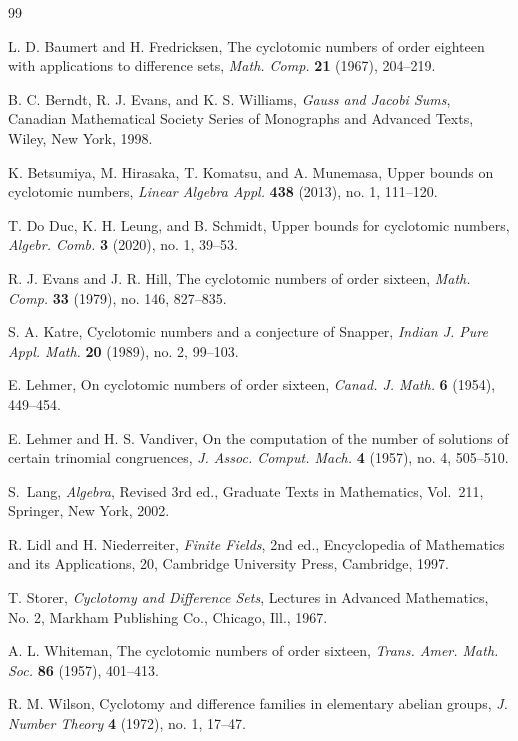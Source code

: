 \documentclass[10pt,a4paper]{article}
\numberwithin{equation}{section}
\begin{document}
\begin{thebibliography}{99}

L. D. Baumert and H. Fredricksen,
\newblock The cyclotomic numbers of order eighteen with applications to difference sets,
\newblock \emph{Math. Comp.} \textbf{21} (1967), 204--219.

B. C. Berndt, R. J. Evans, and K. S. Williams,
\newblock \emph{Gauss and Jacobi Sums},
\newblock Canadian Mathematical Society Series of Monographs and Advanced Texts,
\newblock Wiley, New York, 1998.

K. Betsumiya, M. Hirasaka, T. Komatsu, and A. Munemasa,
\newblock Upper bounds on cyclotomic numbers,
\newblock \emph{Linear Algebra Appl.} \textbf{438} (2013), no. 1, 111--120.

T. Do Duc, K. H. Leung, and B. Schmidt,
\newblock Upper bounds for cyclotomic numbers,
\newblock \emph{Algebr. Comb.} \textbf{3} (2020), no. 1, 39--53.


R. J. Evans and J. R. Hill,
\newblock The cyclotomic numbers of order sixteen,
\newblock \emph{Math. Comp.} \textbf{33} (1979), no. 146, 827--835.

S. A. Katre,
\newblock Cyclotomic numbers and a conjecture of Snapper,
\newblock \emph{Indian J. Pure Appl. Math.} \textbf{20} (1989), no. 2, 99--103.

E. Lehmer,
\newblock On cyclotomic numbers of order sixteen,
\newblock \emph{Canad. J. Math.} \textbf{6} (1954), 449--454.

E. Lehmer and H. S. Vandiver,
\newblock On the computation of the number of solutions of certain trinomial congruences,
\newblock \emph{J. Assoc. Comput. Mach.} \textbf{4} (1957), no. 4, 505--510.

S.~Lang,
\textit{Algebra},
Revised 3rd ed.,
Graduate Texts in Mathematics, Vol.~211,
Springer,
New York,
2002.

R. Lidl and H. Niederreiter,
\newblock \emph{Finite Fields},
\newblock 2nd ed.,
\newblock Encyclopedia of Mathematics and its Applications, 20,
\newblock Cambridge University Press, Cambridge, 1997.

T. Storer,
\newblock \emph{Cyclotomy and Difference Sets},
\newblock Lectures in Advanced Mathematics, No. 2,
\newblock Markham Publishing Co., Chicago, Ill., 1967.

A. L. Whiteman,
\newblock The cyclotomic numbers of order sixteen,
\newblock \emph{Trans. Amer. Math. Soc.} \textbf{86} (1957), 401--413.

R. M. Wilson,
\newblock Cyclotomy and difference families in elementary abelian groups,
\newblock \emph{J. Number Theory} \textbf{4} (1972), no. 1, 17--47.

\end{thebibliography}
\end{document}

